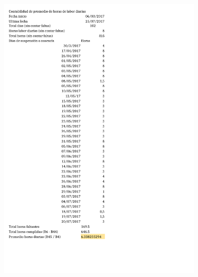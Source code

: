 \documentclass[paper=letter,oneside,fontsize=12pt, parskip=full]{article}
\begin{document}
		\begin{figure}[h!]
			\centering
			\includegraphics[width=10cm]{ContabilidadHorasPasantia.pdf}
		\end{figure}
	
\end{document}
